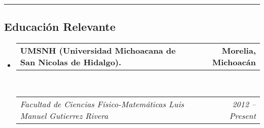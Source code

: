 \documentclass[10pt,letterpaper]{article}
\makeatletter
\newcommand{\headerrow}[2]
{\begin{tabular*}{\linewidth}{l@{\extracolsep{\fill}}r}
	#1 &
	#2 \\
\end{tabular*}}
\makeatother
\begin{document}
\hrule
\vspace{-0.4em}
\subsection*{Educación Relevante}

\begin{itemize}
	\parskip=0.1em

	\item 
	\headerrow
		{\textbf{UMSNH (Universidad Michoacana de San Nicolas de Hidalgo).}}
		{\textbf{Morelia, Michoacán}}
	\\
	\headerrow
		{\emph{Facultad de Ciencias Físico-Matemáticas Luis Manuel Gutierrez Rivera}}
		{\emph{2012 -- Present}}

\end{itemize}
\end{document}

